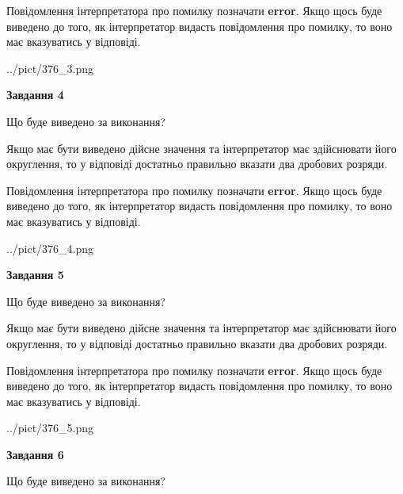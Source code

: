\documentclass[12pt, ukrainian]{article}
\begin{document}
{\begin {Large}
Повідомлення інтерпретатора про помилку позначати \textbf{error}.
Якщо щось буде виведено до того, як інтерпретатор видасть повідомлення про помилку, 
то воно має вказуватись у відповіді. \par

\begin{center}
	{../pict/376_3.png}
\end{center}
\newpage

{\begin {center}\textbf{Завдання 4}\end {center}}\par
Що буде виведено за виконання? \par

Якщо має бути виведено дійсне значення та інтерпретатор має здійснювати його округлення, 
то у відповіді достатньо правильно вказати два дробових розряди.

Повідомлення інтерпретатора про помилку позначати \textbf{error}.
Якщо щось буде виведено до того, як інтерпретатор видасть повідомлення про помилку, 
то воно має вказуватись у відповіді. \par

\begin{center}
	{../pict/376_4.png}
\end{center}
\newpage

{\begin {center}\textbf{Завдання 5}\end {center}}\par
Що буде виведено за виконання? \par

Якщо має бути виведено дійсне значення та інтерпретатор має здійснювати його округлення, 
то у відповіді достатньо правильно вказати два дробових розряди.

Повідомлення інтерпретатора про помилку позначати \textbf{error}.
Якщо щось буде виведено до того, як інтерпретатор видасть повідомлення про помилку, 
то воно має вказуватись у відповіді. \par

\begin{center}
	{../pict/376_5.png}
\end{center}
\newpage

{\begin {center}\textbf{Завдання 6}\end {center}}\par
Що буде виведено за виконання? \par


\end{Large}}
\end{document}
